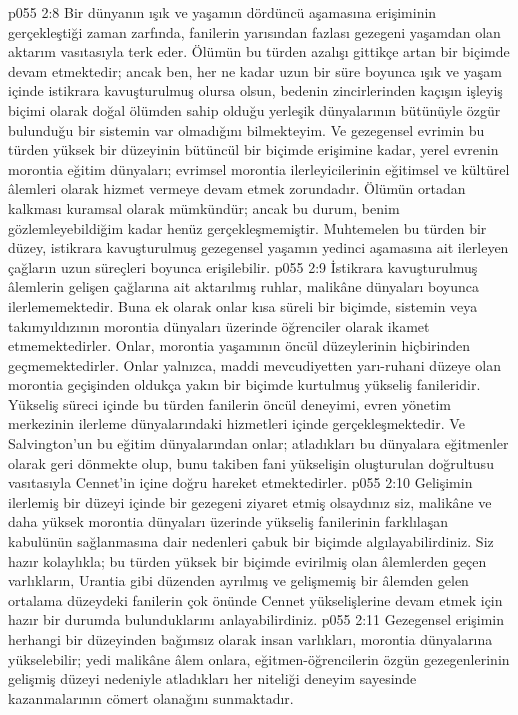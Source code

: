\vs p055 2:8 Bir dünyanın ışık ve yaşamın dördüncü aşamasına erişiminin gerçekleştiği zaman zarfında, fanilerin yarısından fazlası gezegeni yaşamdan olan aktarım vasıtasıyla terk eder. Ölümün bu türden azalışı gittikçe artan bir biçimde devam etmektedir; ancak ben, her ne kadar uzun bir süre boyunca ışık ve yaşam içinde istikrara kavuşturulmuş olursa olsun, bedenin zincirlerinden kaçışın işleyiş biçimi olarak doğal ölümden sahip olduğu yerleşik dünyalarının bütünüyle özgür bulunduğu bir sistemin var olmadığını bilmekteyim. Ve gezegensel evrimin bu türden yüksek bir düzeyinin bütüncül bir biçimde erişimine kadar, yerel evrenin morontia eğitim dünyaları; evrimsel morontia ilerleyicilerinin eğitimsel ve kültürel âlemleri olarak hizmet vermeye devam etmek zorundadır. Ölümün ortadan kalkması kuramsal olarak mümkündür; ancak bu durum, benim gözlemleyebildiğim kadar henüz gerçekleşmemiştir. Muhtemelen bu türden bir düzey, istikrara kavuşturulmuş gezegensel yaşamın yedinci aşamasına ait ilerleyen çağların uzun süreçleri boyunca erişilebilir.
\vs p055 2:9 İstikrara kavuşturulmuş âlemlerin gelişen çağlarına ait aktarılmış ruhlar, malikâne dünyaları boyunca ilerlememektedir. Buna ek olarak onlar kısa süreli bir biçimde, sistemin veya takımyıldızının morontia dünyaları üzerinde öğrenciler olarak ikamet etmemektedirler. Onlar, morontia yaşamının öncül düzeylerinin hiçbirinden geçmemektedirler. Onlar yalnızca, maddi mevcudiyetten yarı\hyp{}ruhani düzeye olan morontia geçişinden oldukça yakın bir biçimde kurtulmuş yükseliş fanileridir. Yükseliş süreci içinde bu türden fanilerin öncül deneyimi, evren yönetim merkezinin ilerleme dünyalarındaki hizmetleri içinde gerçekleşmektedir. Ve Salvington’un bu eğitim dünyalarından onlar; atladıkları bu dünyalara eğitmenler olarak geri dönmekte olup, bunu takiben fani yükselişin oluşturulan doğrultusu vasıtasıyla Cennet’in içine doğru hareket etmektedirler.
\vs p055 2:10 Gelişimin ilerlemiş bir düzeyi içinde bir gezegeni ziyaret etmiş olsaydınız siz, malikâne ve daha yüksek morontia dünyaları üzerinde yükseliş fanilerinin farklılaşan kabulünün sağlanmasına dair nedenleri çabuk bir biçimde algılayabilirdiniz. Siz hazır kolaylıkla; bu türden yüksek bir biçimde evirilmiş olan âlemlerden geçen varlıkların, Urantia gibi düzenden ayrılmış ve gelişmemiş bir âlemden gelen ortalama düzeydeki fanilerin çok önünde Cennet yükselişlerine devam etmek için hazır bir durumda bulunduklarını anlayabilirdiniz.
\vs p055 2:11 Gezegensel erişimin herhangi bir düzeyinden bağımsız olarak insan varlıkları, morontia dünyalarına yükselebilir; yedi malikâne âlem onlara, eğitmen\hyp{}öğrencilerin özgün gezegenlerinin gelişmiş düzeyi nedeniyle atladıkları her niteliği deneyim sayesinde kazanmalarının cömert olanağını sunmaktadır.
